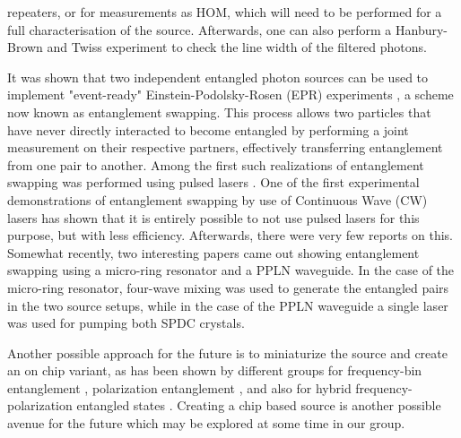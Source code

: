 \documentclass{article}
\begin{document}
repeaters, or for measurements as HOM, which will need to be performed for a
full characterisation of the source. Afterwards, one can also perform a
Hanbury-Brown and Twiss \cite{Brown_Twiss_1954} experiment to check the line
width of the filtered photons. \par It was shown \cite{Zukowski_1993} that two
independent entangled photon sources can be used to implement "event-ready"
Einstein-Podolsky-Rosen (EPR) experiments \cite{EPR1935}, a scheme now known as
entanglement swapping. This process allows two particles that have never
directly interacted to become entangled by performing a joint measurement on
their respective partners, effectively transferring entanglement from one pair
to another. Among the first such realizations of entanglement swapping was
performed using pulsed lasers \cite{Kaltenbaek_2006}. One of the first
\cite{Halder_Beveratos_Jorel_Zbinden_Simon_Scarani_Gisin_2007} experimental
demonstrations of entanglement swapping by use of Continuous Wave (CW) lasers
has shown that it is entirely possible to not use pulsed lasers for this
purpose, but with less efficiency. Afterwards, there were very few reports on
this. Somewhat recently, two
\cite{Samara_Maring_Martin_Raja_Kippenberg_Zbinden_Thew_2021,Tsujimoto_Tanaka_Iwasaki_Ikuta_Miki_Yamashita_Terai_Yamamoto_Koashi_Imoto_2018}
interesting papers came out showing entanglement swapping using a micro-ring
resonator and a PPLN waveguide. In the case of the micro-ring resonator,
four-wave mixing was used to generate the entangled pairs in the two source
setups, while in the case of the PPLN waveguide a single laser was used for
pumping both SPDC crystals.

\par Another possible approach for the future is to miniaturize the source and
create an on chip variant, as has been shown by different groups for
frequency-bin entanglement \cite{S_G_S_C_F_B_L_G_B_2022}, polarization
entanglement \cite{L_Z_F_F_L_L_W_R_D_X_etal._2017}, and also for hybrid
frequency-polarization entangled states \cite{F_R_D_F_L_M_A_B_D_2023}. Creating
a chip based source is another possible avenue for the future which may be
explored at some time in our group.
\end{document}

